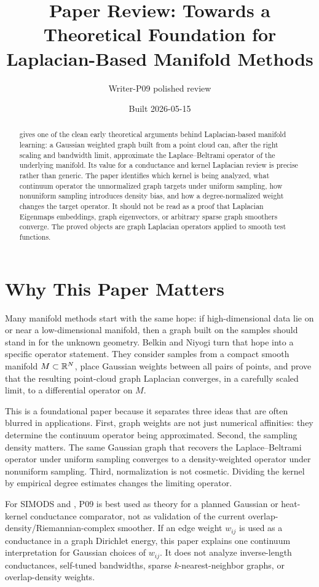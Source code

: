 \documentclass[11pt]{article}
\title{Paper Review: Towards a Theoretical Foundation for Laplacian-Based Manifold Methods}
\author{Writer-P09 polished review}
\date{Built 2026-05-15}
\begin{document}
\maketitle

\begin{abstract}
\citet{belkin2008towards} gives one of the clean early theoretical arguments
behind Laplacian-based manifold learning: a Gaussian weighted graph built from
a point cloud can, after the right scaling and bandwidth limit, approximate the
Laplace--Beltrami operator of the underlying manifold. Its value for a
conductance and kernel Laplacian review is precise rather than generic. The
paper identifies which kernel is being analyzed, what continuum operator the
unnormalized graph targets under uniform sampling, how nonuniform sampling
introduces density bias, and how a degree-normalized weight changes the target
operator. It should not be read as a proof that Laplacian Eigenmaps embeddings,
graph eigenvectors, or arbitrary sparse graph smoothers converge. The proved
objects are graph Laplacian operators applied to smooth test functions.
\end{abstract}

\section{Why This Paper Matters}

Many manifold methods start with the same hope: if high-dimensional data lie
on or near a low-dimensional manifold, then a graph built on the samples should
stand in for the unknown geometry. Belkin and Niyogi turn that hope into a
specific operator statement. They consider samples from a compact smooth
manifold \(M\subset\mathbb{R}^N\), place Gaussian weights between all pairs of points,
and prove that the resulting point-cloud graph Laplacian converges, in a
carefully scaled limit, to a differential operator on \(M\).

This is a foundational paper because it separates three ideas that are often
blurred in applications. First, graph weights are not just numerical affinities:
they determine the continuum operator being approximated. Second, the sampling
density matters. The same Gaussian graph that recovers the Laplace--Beltrami
operator under uniform sampling converges to a density-weighted operator under
nonuniform sampling. Third, normalization is not cosmetic. Dividing the kernel
by empirical degree estimates changes the limiting operator.

For SIMODS and , P09 is best used as theory for a planned
Gaussian or heat-kernel conductance comparator, not as validation of the
current overlap-density/Riemannian-complex smoother. If an edge weight
\(w_{ij}\) is used as a conductance in a graph Dirichlet energy, this paper
explains one continuum interpretation for Gaussian choices of \(w_{ij}\). It
does not analyze inverse-length conductances, self-tuned bandwidths, sparse
\(k\)-nearest-neighbor graphs, or overlap-density weights.
\end{document}
